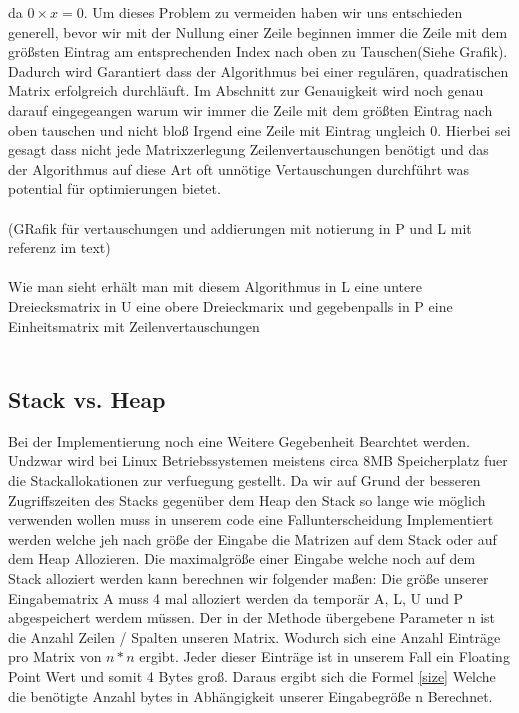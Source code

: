 \documentclass[course=erap]{aspdoc}
\begin{document}
da $ 0 \times x = 0$. Um dieses Problem zu vermeiden haben wir uns entschieden generell, bevor wir mit der Nullung einer Zeile beginnen immer die Zeile mit dem größsten Eintrag
am entsprechenden Index nach oben zu Tauschen(Siehe Grafik). Dadurch wird Garantiert dass der Algorithmus bei einer regulären, quadratischen Matrix erfolgreich durchläuft. Im Abschnitt zur Genauigkeit wird noch genau darauf 
eingegeangen warum wir immer die Zeile mit dem größten Eintrag nach oben tauschen und nicht bloß Irgend eine Zeile mit Eintrag ungleich 0.
Hierbei sei gesagt dass nicht jede Matrixzerlegung Zeilenvertauschungen benötigt und das der Algorithmus auf diese Art oft unnötige Vertauschungen durchführt was potential für 
optimierungen bietet.\\\\
 

 (GRafik für vertauschungen und addierungen mit notierung in P und L mit referenz im text)\\\\
\noindent\hspace*{15mm}%
 Wie man sieht erhält man mit diesem Algorithmus in L eine untere Dreiecksmatrix in U eine obere Dreieckmarix 
 und gegebenpalls in P eine Einheitsmatrix mit Zeilenvertauschungen\\\\

\subsection{Stack vs. Heap}
 Bei der Implementierung noch eine Weitere Gegebenheit Bearchtet werden.
 Undzwar wird bei Linux Betriebssystemen meistens circa 8MB Speicherplatz fuer die Stackallokationen zur verfuegung gestellt. Da wir auf Grund der besseren Zugriffszeiten des Stacks \cite{stack} gegenüber dem Heap den Stack so lange wie möglich verwenden wollen
  muss in unserem code eine Fallunterscheidung Implementiert werden welche jeh nach größe der Eingabe die Matrizen auf dem Stack oder auf dem Heap Allozieren.
 Die maximalgröße einer Eingabe welche noch auf dem Stack alloziert werden kann berechnen wir folgender maßen:
 Die größe unserer Eingabematrix A muss 4 mal alloziert werden da temporär A, L, U und P abgespeichert werdem müssen.
 Der in der Methode übergebene Parameter n ist die Anzahl Zeilen / Spalten unseren Matrix. Wodurch sich eine Anzahl Einträge pro Matrix von $n * n $ ergibt. 
 Jeder dieser Einträge ist in unserem Fall ein Floating Point Wert und somit 4 Bytes groß.
 Daraus ergibt sich die Formel \ref{size} Welche die benötigte Anzahl bytes in Abhängigkeit unserer Eingabegröße n Berechnet.
 
\end{document}
